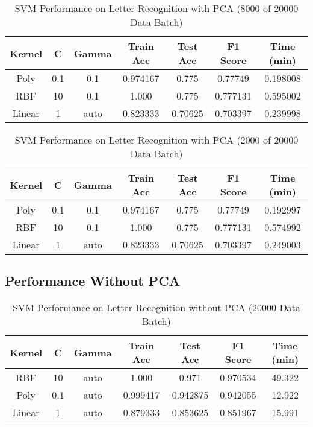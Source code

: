 \documentclass[conference]{IEEEtran}
\begin{document}
\begin{table}[H]
\centering
\caption{SVM Performance on Letter Recognition with PCA (8000 of 20000 Data Batch)}

\begin{tabular}{|c|c|c|c|c|c|c|}
\hline
Kernel & C & Gamma & Train Acc & Test Acc & F1 Score & Time (min) \\ \hline
Poly & 0.1 & 0.1 & 0.974167 & 0.775 & 0.77749 & 0.198008 \\ \hline
RBF & 10 & 0.1 & 1.000 & 0.775 & 0.777131 & 0.595002 \\ \hline
Linear & 1 & auto & 0.823333 & 0.70625 & 0.703397 & 0.239998 \\ \hline

\end{tabular}
\end{table}


\begin{table}[H]
\centering
\caption{SVM Performance on Letter Recognition with PCA (2000 of 20000 Data Batch)}
\begin{tabular}{|c|c|c|c|c|c|c|}
\hline
Kernel & C & Gamma & Train Acc & Test Acc & F1 Score & Time (min) \\ \hline
Poly & 0.1 & 0.1 & 0.974167 & 0.775 & 0.77749 & 0.192997 \\ \hline
RBF & 10 & 0.1 & 1.000 & 0.775 & 0.777131 & 0.574992 \\ \hline
Linear & 1 & auto & 0.823333 & 0.70625 & 0.703397 & 0.249003 \\ \hline
\end{tabular}
\end{table}



\subsection{Performance Without PCA}


\begin{table}[H]
\centering
\caption{SVM Performance on Letter Recognition without PCA (20000 Data Batch)}
\begin{tabular}{|c|c|c|c|c|c|c|}
\hline
Kernel & C & Gamma & Train Acc & Test Acc & F1 Score & Time (min) \\ \hline
RBF & 10 & auto & 1.000 & 0.971 & 0.970534 & 49.322 \\ \hline
Poly & 0.1 & auto & 0.999417 & 0.942875 & 0.942055 & 12.922 \\ \hline
Linear & 1 & auto & 0.879333 & 0.853625 & 0.851967 & 15.991 \\ \hline

\end{tabular}
\end{table}
\end{document}
